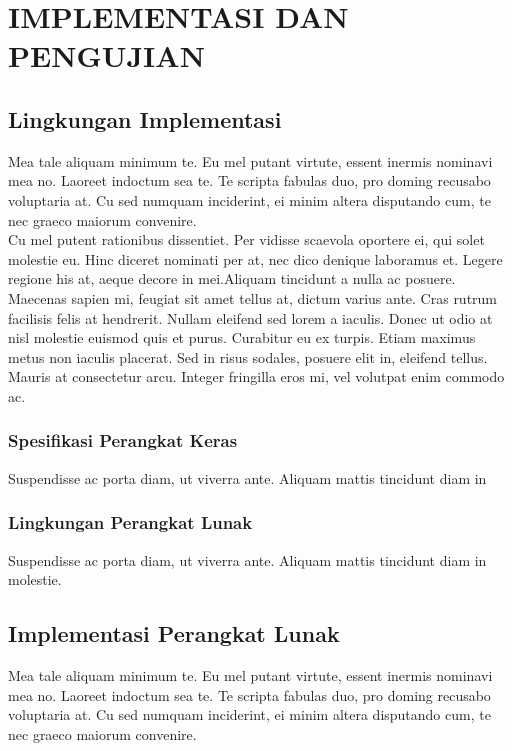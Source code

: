 \chapter{IMPLEMENTASI DAN PENGUJIAN}

\vspace{4.5pt}

\section{Lingkungan Implementasi}
Mea tale aliquam minimum te. Eu mel putant virtute, essent inermis nominavi mea no. Laoreet indoctum sea te. Te scripta fabulas duo, pro doming recusabo voluptaria at. Cu sed numquam inciderint, ei minim altera disputando cum, te nec graeco maiorum convenire.\\
Cu mel putent rationibus dissentiet. Per vidisse scaevola oportere ei, qui solet molestie eu. Hinc diceret nominati per at, nec dico denique laboramus et. Legere regione his at, aeque decore in mei.Aliquam tincidunt a nulla ac posuere. Maecenas sapien mi, feugiat sit amet tellus at, dictum varius ante. Cras rutrum facilisis felis at hendrerit. Nullam eleifend sed lorem a iaculis. Donec ut odio at nisl molestie euismod quis et purus. Curabitur eu ex turpis. Etiam maximus metus non iaculis placerat. Sed in risus sodales, posuere elit in, eleifend tellus. Mauris at consectetur arcu. Integer fringilla eros mi, vel volutpat enim commodo ac.\\

\subsection{Spesifikasi Perangkat Keras}
Suspendisse ac porta diam, ut viverra ante. Aliquam mattis tincidunt diam in \\

\subsection{Lingkungan Perangkat Lunak}
Suspendisse ac porta diam, ut viverra ante. Aliquam mattis tincidunt diam in molestie.\\

\section{Implementasi Perangkat Lunak}
Mea tale aliquam minimum te. Eu mel putant virtute, essent inermis nominavi mea no. Laoreet indoctum sea te. Te scripta fabulas duo, pro doming recusabo voluptaria at. Cu sed numquam inciderint, ei minim altera disputando cum, te nec graeco maiorum convenire.\\


